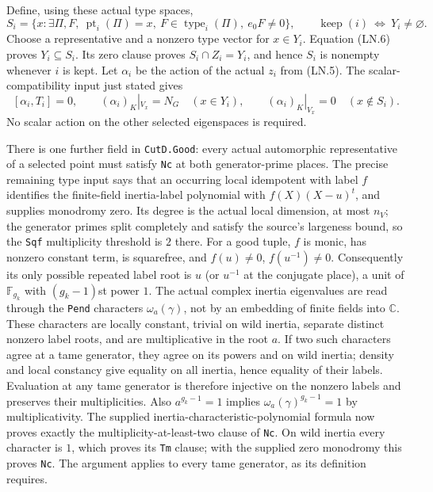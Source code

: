 Define, using these actual type spaces,
\[
 S_i=\{x:\exists\Pi,F,\ \operatorname{pt}_i(\Pi)=x,
          \ F\in\operatorname{type}_i(\Pi),\ e_0F\ne0\},
 \qquad \operatorname{keep}(i)\ \Longleftrightarrow\ Y_i\ne\varnothing.
 \tag{LN.7}
\]
Choose a representative and a nonzero type vector for $x\in Y_i$.
Equation (LN.6) proves $Y_i\subseteq S_i$.  Its zero clause proves
$S_i\cap Z_i=Y_i$, and hence $S_i$ is nonempty whenever $i$ is kept.
Let $\alpha_i$ be the action of the actual $z_i$ from (LN.5).
The scalar-compatibility input just stated gives
\[
 [\alpha_i,T_i]=0,\qquad
 (\alpha_i)_K|_{V_x}=N_G\quad(x\in Y_i),\qquad
 (\alpha_i)_K|_{V_x}=0\quad(x\notin S_i).
 \tag{LN.8}
\]
No scalar action on the other selected eigenspaces is required.

There is one further field in \texttt{CutD.Good}: every actual
automorphic representative of a selected point must satisfy
\texttt{Nc} at both generator-prime places.  The precise remaining
type input says that an occurring local idempotent with label $f$
identifies the finite-field inertia-label polynomial with
$f(X)(X-u)^t$, and supplies monodromy zero.  Its degree is the
actual local dimension, at most $n_V$; the generator primes split
completely and satisfy the source's largeness bound, so the
\texttt{Sqf} multiplicity threshold is $2$ there.  For a
good tuple, $f$ is monic, has nonzero constant term, is squarefree,
and $f(u)\ne0$, $f(u^{-1})\ne0$.  Consequently its only possible repeated
label root is $u$ (or $u^{-1}$ at the conjugate place), a unit of
$\mathbb F_{g_k}$ with $(g_k-1)$st power $1$.
The actual complex inertia eigenvalues are read through the
\texttt{Pend} characters $\omega_a(\gamma)$, not by an embedding
of finite fields into $\mathbb C$.  These characters are locally
constant, trivial on wild inertia, separate distinct nonzero label
roots, and are multiplicative in the root $a$.  If two such
characters agree at a tame generator, they agree on its powers
and on wild inertia; density and local constancy give equality on
all inertia, hence equality of their labels.  Evaluation at any
tame generator is therefore injective on the nonzero labels and
preserves their multiplicities.  Also
$a^{g_k-1}=1$ implies $\omega_a(\gamma)^{g_k-1}=1$ by
multiplicativity.  The supplied inertia-characteristic-polynomial
formula now proves exactly the multiplicity-at-least-two clause
of \texttt{Nc}.  On wild inertia every character is $1$, which
proves its \texttt{Tm} clause; with the supplied zero monodromy
this proves \texttt{Nc}.  The argument applies to every tame
generator, as its definition requires.

